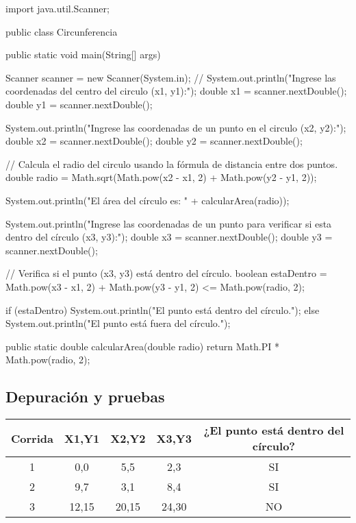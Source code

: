 \begin{javaCode}
import java.util.Scanner;

public class Circunferencia {
    public static void main(String[] args) {
        Scanner scanner = new Scanner(System.in);
// 
        System.out.println("Ingrese las coordenadas del centro del circulo (x1, y1):");
        double x1 = scanner.nextDouble();
        double y1 = scanner.nextDouble();

        System.out.println("Ingrese las coordenadas de un punto en el circulo (x2, y2):");
        double x2 = scanner.nextDouble();
        double y2 = scanner.nextDouble();

        // Calcula el radio del circulo usando la fórmula de distancia entre dos puntos.
        double radio = Math.sqrt(Math.pow(x2 - x1, 2) + Math.pow(y2 - y1, 2));

        System.out.println("El área del círculo es: " + calcularArea(radio));

        System.out.println("Ingrese las coordenadas de un punto para verificar si esta dentro del círculo (x3, y3):");
        double x3 = scanner.nextDouble();
        double y3 = scanner.nextDouble();

        // Verifica si el punto (x3, y3) está dentro del círculo.
        boolean estaDentro = Math.pow(x3 - x1, 2) + Math.pow(y3 - y1, 2) <= Math.pow(radio, 2);

        if (estaDentro) {
            System.out.println("El punto está dentro del círculo.");
        } else {
            System.out.println("El punto está fuera del círculo.");
        }
    }

    public static double calcularArea(double radio) {
        return Math.PI * Math.pow(radio, 2);
    }
}
\end{javaCode}

\subsection{Depuración y pruebas}

\begin{table}[h]
\centering
\begin{tabular}{|c|c|c|c|c|}
  \hline
  Corrida & X1,Y1 & X2,Y2 & X3,Y3 & ¿El punto está dentro del círculo? \\
  \hline
  1 & 0,0 & 5,5 & 2,3 & SI \\
  \hline
  2 & 9,7 & 3,1 & 8,4 & SI \\
  \hline
  3 & 12,15 & 20,15 & 24,30 & NO \\
  \hline
\end{tabular}
\end{table}

